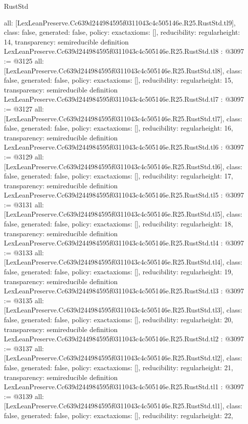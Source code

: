 \begin{lexlean}{RustStd}
\begin{coremodule}
{  all: [LexLeanPreserve.Cc639d244984595f0311043c4c505146e.R25.RustStd.tl9],
  class: false,
  generated: false,
  policy: exact{axioms: []},
  reducibility: regular{height: 14},
  transparency: semireducible
}
definition LexLeanPreserve.Cc639d244984595f0311043c4c505146e.R25.RustStd.tl8 : @3097 := @3125 {
  all: [LexLeanPreserve.Cc639d244984595f0311043c4c505146e.R25.RustStd.tl8],
  class: false,
  generated: false,
  policy: exact{axioms: []},
  reducibility: regular{height: 15},
  transparency: semireducible
}
definition LexLeanPreserve.Cc639d244984595f0311043c4c505146e.R25.RustStd.tl7 : @3097 := @3127 {
  all: [LexLeanPreserve.Cc639d244984595f0311043c4c505146e.R25.RustStd.tl7],
  class: false,
  generated: false,
  policy: exact{axioms: []},
  reducibility: regular{height: 16},
  transparency: semireducible
}
definition LexLeanPreserve.Cc639d244984595f0311043c4c505146e.R25.RustStd.tl6 : @3097 := @3129 {
  all: [LexLeanPreserve.Cc639d244984595f0311043c4c505146e.R25.RustStd.tl6],
  class: false,
  generated: false,
  policy: exact{axioms: []},
  reducibility: regular{height: 17},
  transparency: semireducible
}
definition LexLeanPreserve.Cc639d244984595f0311043c4c505146e.R25.RustStd.tl5 : @3097 := @3131 {
  all: [LexLeanPreserve.Cc639d244984595f0311043c4c505146e.R25.RustStd.tl5],
  class: false,
  generated: false,
  policy: exact{axioms: []},
  reducibility: regular{height: 18},
  transparency: semireducible
}
definition LexLeanPreserve.Cc639d244984595f0311043c4c505146e.R25.RustStd.tl4 : @3097 := @3133 {
  all: [LexLeanPreserve.Cc639d244984595f0311043c4c505146e.R25.RustStd.tl4],
  class: false,
  generated: false,
  policy: exact{axioms: []},
  reducibility: regular{height: 19},
  transparency: semireducible
}
definition LexLeanPreserve.Cc639d244984595f0311043c4c505146e.R25.RustStd.tl3 : @3097 := @3135 {
  all: [LexLeanPreserve.Cc639d244984595f0311043c4c505146e.R25.RustStd.tl3],
  class: false,
  generated: false,
  policy: exact{axioms: []},
  reducibility: regular{height: 20},
  transparency: semireducible
}
definition LexLeanPreserve.Cc639d244984595f0311043c4c505146e.R25.RustStd.tl2 : @3097 := @3137 {
  all: [LexLeanPreserve.Cc639d244984595f0311043c4c505146e.R25.RustStd.tl2],
  class: false,
  generated: false,
  policy: exact{axioms: []},
  reducibility: regular{height: 21},
  transparency: semireducible
}
definition LexLeanPreserve.Cc639d244984595f0311043c4c505146e.R25.RustStd.tl1 : @3097 := @3139 {
  all: [LexLeanPreserve.Cc639d244984595f0311043c4c505146e.R25.RustStd.tl1],
  class: false,
  generated: false,
  policy: exact{axioms: []},
  reducibility: regular{height: 22},
}
\end{coremodule}
\end{lexlean}
